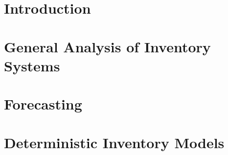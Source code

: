 \section{Introduction}
\label{sec:introduction}

\newpage
\section{General Analysis of Inventory Systems}
\label{sec:general}

\newpage
\section{Forecasting}
\label{sec:forecast}

\newpage
\section{Deterministic Inventory Models}
\label{sec:deterministic}



%
%
%
%
%
%
%
%


